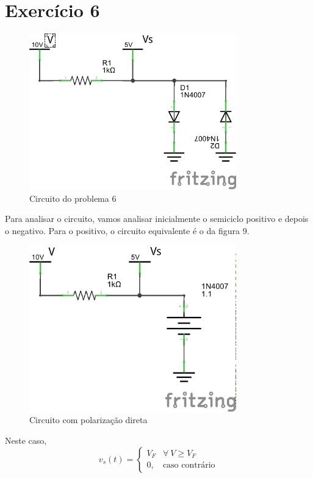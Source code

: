 \documentclass[12pt, a4paper, twoside]{article}
\begin{document}
\section{Exercício 6}

\begin{figure}
    \centering
    \includegraphics[width=0.8\textwidth]{figs/rel3/c3.png}
    \caption{Circuito do problema 6}
\end{figure}

Para analisar o circuito, vamos analisar inicialmente o semiciclo positivo e depois
o negativo. Para o positivo, o circuito equivalente é o da figura 9.

\begin{figure}
    \centering
    \includegraphics[width=0.8\textwidth]{figs/rel3/c6-1.png}
    \caption{Circuito com polarização direta}
\end{figure}

Neste caso,
\begin{equation}
    v_s(t) =
    \begin{cases}
        V_F & \forall\ V \geq V_F \\
        0, & \text{caso contrário}
    \end{cases}
\end{equation}
\end{document}

